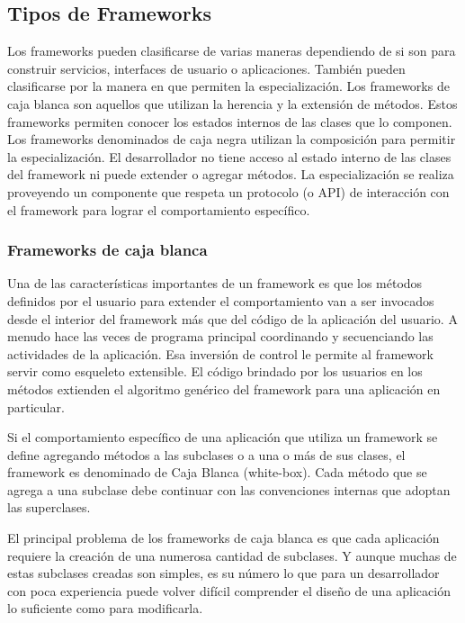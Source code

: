 \subsection{Tipos de Frameworks}

    Los frameworks pueden clasificarse de varias maneras dependiendo de si son para construir servicios, interfaces de usuario o aplicaciones. También pueden clasificarse por la manera en que permiten la especialización. Los frameworks de caja blanca son aquellos que utilizan la herencia y la extensión de métodos. Estos frameworks permiten conocer los estados internos de las clases que lo componen. Los frameworks denominados de caja negra utilizan la composición para permitir la especialización. El desarrollador no tiene acceso al estado interno de las clases del framework ni puede extender o agregar métodos. La especialización se realiza proveyendo un componente que respeta un protocolo (o API) de interacción con el framework para lograr el comportamiento específico.   


\subsubsection{Frameworks de caja blanca}

	Una de las características importantes de un framework es que los métodos definidos por el usuario para extender el comportamiento van a ser invocados desde el interior del framework más que del código de la aplicación del usuario. A menudo hace las veces de programa principal coordinando y secuenciando las actividades de la aplicación. Esa inversión de control le permite al framework servir como esqueleto extensible. El código brindado por los usuarios en los métodos extienden el algoritmo genérico del framework para una aplicación en particular. 
	
	Si el comportamiento específico de una aplicación que utiliza un framework se define agregando métodos a las subclases o a una o más de sus clases, el framework es denominado de Caja Blanca (white-box). Cada método que se agrega a una subclase debe continuar con las convenciones internas que adoptan las superclases. 
	
	El principal problema de los frameworks de caja blanca es que cada aplicación requiere la creación de una numerosa cantidad  de subclases. Y aunque muchas de estas subclases creadas son simples, es su número lo que para un desarrollador con poca experiencia puede volver difícil comprender el diseño de una aplicación lo suficiente como para modificarla.
	
